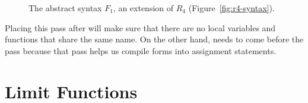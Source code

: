 \documentclass[11pt]{book}
\newcommand{\gray}[1]{{\color{gray} #1}}
\begin{document}
\begin{figure}[tp]
\centering
\fbox{
\begin{minipage}{0.96\textwidth}
\[
\begin{array}{lcl}
\Exp &::=& \gray{ \INT{\Int} \mid \READ{} \mid \NEG{\Exp} } \\
     &\mid& \gray{ \ADD{\Exp}{\Exp} 
      \mid \BINOP{\code{'-}}{\Exp}{\Exp} } \\
     &\mid& \gray{ \VAR{\Var} \mid \LET{\Var}{\Exp}{\Exp} } \\
     &\mid& \gray{ \BOOL{\itm{bool}} 
      \mid \AND{\Exp}{\Exp} }\\
     &\mid& \gray{ \OR{\Exp}{\Exp}
      \mid \NOT{\Exp} } \\
     &\mid& \gray{ \BINOP{\itm{cmp}}{\Exp}{\Exp}
      \mid \IF{\Exp}{\Exp}{\Exp} } \\
     &\mid& \gray{ \VECTOR{\Exp} } \\
     &\mid& \gray{ \VECREF{\Exp}{\INT{\Int}} }\\
     &\mid& \gray{ \VECSET{\Exp}{\INT{\Int}}{\Exp}} \\
     &\mid& \gray{ \VOID{} \mid \LP\key{HasType}~\Exp~\Type \RP 
     \mid \APPLY{\Exp}{\Exp\ldots} }\\
     &\mid& \FUNREF{\Var}\\
 \Def &::=& \gray{ \FUNDEF{\Var}{([\Var \code{:} \Type]\ldots)}{\Type}{\code{'()}}{\Exp} }\\
  F_1 &::=& \PROGRAMDEFS{\code{'()}}{\LP \Def\ldots \RP}
\end{array}
\]
\end{minipage}
}
\caption{The abstract syntax $F_1$, an extension of $R_4$
  (Figure~\ref{fig:r4-syntax}).}
\label{fig:f1-syntax}
\end{figure}


Placing this pass after  will make sure that there are
no local variables and functions that share the same name. On the
other hand,  needs to come before the
 pass because that pass helps us compile
 forms into assignment statements.

\section{Limit Functions}
\label{sec:limit-functions-r4}
\end{document}
